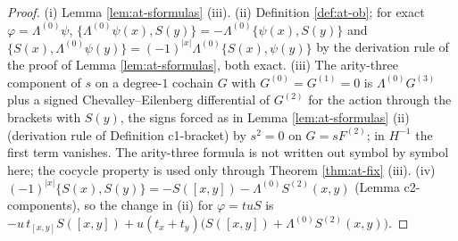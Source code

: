 \begin{proof}
(i) Lemma \ref{lem:at-sformulas} (iii). (ii) Definition \ref{def:at-ob}; for exact $\varphi=\Lambda^{(0)}\psi$, $\{\Lambda^{(0)}\psi(x),S(y)\}=-\Lambda^{(0)}\{\psi(x),S(y)\}$ and $\{S(x),\Lambda^{(0)}\psi(y)\}=(-1)^{|x|}\Lambda^{(0)}\{S(x),\psi(y)\}$ by the derivation rule of the proof of Lemma \ref{lem:at-sformulas}, both exact. (iii) The arity-three component of $s$ on a degree-$1$ cochain $G$ with $G^{(0)}=G^{(1)}=0$ is $\Lambda^{(0)}G^{(3)}$ plus a signed Chevalley--Eilenberg differential of $G^{(2)}$ for the action through the brackets with $S(y)$, the signs forced as in Lemma \ref{lem:at-sformulas} (ii) (derivation rule of Definition c1-bracket) by $s^2=0$ on $G=sF^{(2)}$; in $H^{-1}$ the first term vanishes. The arity-three formula is not written out symbol by symbol here; the cocycle property is used only through Theorem \ref{thm:at-fix} (iii). (iv) $(-1)^{|x|}\{S(x),S(y)\}=-S([x,y])-\Lambda^{(0)}S^{(2)}(x,y)$ (Lemma c2-components), so the change in (ii) for $\varphi=tuS$ is $-u\,t_{[x,y]}S([x,y])+u(t_x+t_y)\big(S([x,y])+\Lambda^{(0)}S^{(2)}(x,y)\big)$.
\end{proof}


